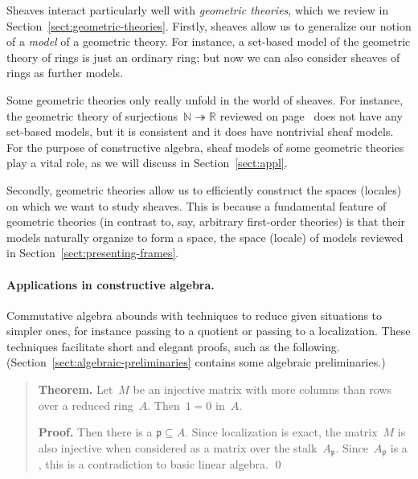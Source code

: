 \documentclass{ws-rv9x6}
\newcommand{\NN}{\mathbb{N}}
\newcommand{\RR}{\mathbb{R}}
\newcommand{\ppp}{\mathfrak{p}}
\renewcommand{\_}{\mathpunct{.}}
\newcommand{\?}{\,{:}\,}
\begin{document}
Sheaves interact particularly well with \emph{geometric theories}, which we
review in Section~\ref{sect:geometric-theories}. Firstly, sheaves allow us to
generalize our notion of a \emph{model} of a geometric theory. For instance, a
set-based model of the geometric theory of rings is just an ordinary ring; but
now we can also consider sheaves of rings as further models.

Some geometric theories only really unfold in the world of sheaves. For
instance, the geometric theory of surjections~$\NN \twoheadrightarrow \RR$
reviewed on page~\pageref{item:theory-of-surjections} does not have any
set-based models, but it is consistent and it does have nontrivial sheaf
models. For the purpose of constructive algebra, sheaf models of some geometric
theories play a vital role, as we will discuss in Section~\ref{sect:appl}.

Secondly, geometric theories allow us to efficiently construct the spaces
(locales) on which we want to study sheaves. This is because a fundamental
feature of geometric theories (in contrast to, say, arbitrary first-order
theories) is that their models naturally organize to form a space, the
space (locale) of models reviewed in Section~\ref{sect:presenting-frames}.



\paragraph{Applications in constructive algebra.}
Commutative algebra abounds with techniques to reduce given situations to
simpler ones, for instance passing to a quotient or passing to a
localization. These techniques facilitate short and elegant proofs, such as the
following. (Section~\ref{sect:algebraic-preliminaries} contains some algebraic
preliminaries.)

\begin{quote}
\textbf{Theorem.} Let~$M$ be an injective matrix with more columns than rows
over a reduced ring~$A$. Then~$1 = 0$ in~$A$.

\textbf{Proof.}  Then there is a  $\ppp \subseteq A$. Since localization is exact, the matrix~$M$ is also injective when
considered as a matrix over the stalk~$A_\ppp$. Since~$A_\ppp$ is a
, this is a contradiction to basic linear algebra. \qed
\end{quote}
\end{document}
